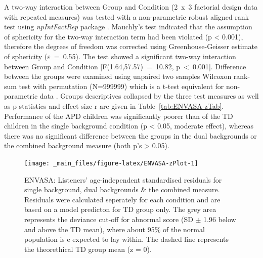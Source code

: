 \documentclass[a4paper, twoside]{templates/ociamthesis}
\begin{document}
A two-way interaction between Group and Condition (2~x~3 factorial design data with repeated measures) was tested with a non-parametric robust aligned rank test using \emph{npIntFactRep} package \autocite{npIntFactRepPackageR}. Mauchly's test indicated that the assumption of sphericity for the two-way interaction term had been violated (p \textless{} 0.001), therefore the degrees of freedom was corrected using Greenhouse-Geisser estimate of sphericity (\(\varepsilon\)~=~0.55). The test showed a significant two-way interaction between Group and Condition {[}F(1.64,57.57)~=~10.82, p~\textless~0.001{]}. Difference between the groups were examined using unpaired two samples Wilcoxon rank-sum test with permutation (N=999999) which is a t-test equivalent for non-parametric data \autocite[\emph{coin::wilcox\_test()};][]{CoinPackageR}. Groups descriptives collapsed by the three test measures as well as p statistics and effect size r are given in Table~\ref{tab:ENVASA-zTab}. Performance of the APD children was significantly poorer than of the TD children in the single background condition (p \textless{} 0.05, moderate effect), whereas there was no significant difference between the groups in the dual backgrounds or the combined background measure (both p's \textgreater{} 0.05).\\

\begin{figure}

{\centering \texttt{[image: \_main\_files/figure-latex/ENVASA-zPlot-1]} 

}

\caption{ENVASA: Listeners' age-independent standardised residuals for single background, dual backgrounds \& the combined measure. Residuals were calculated seperately for each condition and are based on a model predicton for TD group only. The grey area represents the deviance cut-off for abnormal score (SD $\pm$ 1.96 below and above the TD mean), where about 95\% of the normal population is e expected to lay within. The dashed line represents the theorethical TD group mean (z = 0).}\label{fig:ENVASA-zPlot}
\end{figure}
\end{document}
